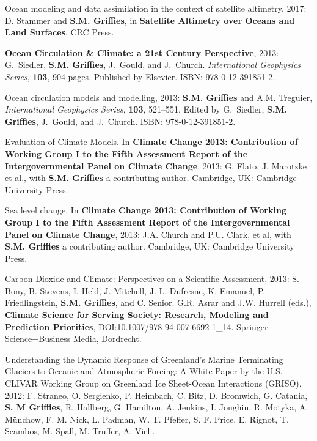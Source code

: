 \begin{etaremune}

\item Ocean modeling and data assimilation in the context of satellite altimetry, 2017: D. Stammer and {\bf S.M. Grif\/f\/ies}, in  {\bf Satellite Altimetry over Oceans and Land Surfaces}, CRC Press.
  
\item {\bf Ocean Circulation \& Climate: a 21st Century Perspective},
  2013: G.\ Siedler, {\bf S.M. Griffies}, J.\ Gould, and J.\ Church.
  {\it International Geophysics Series}, {\bf 103}, 904
  pages. Published by Elsevier.  ISBN: 978-0-12-391851-2.

\item Ocean circulation models and modelling, 2013: {\bf
    S.M. Griffies} and A.M. Treguier, {\it International Geophysics
    Series}, {\bf 103}, 521--551.  Edited by G.\ Siedler, {\bf
    S.M. Griffies}, J.\ Gould, and J.\ Church.  ISBN:
  978-0-12-391851-2.

\item Evaluation of Climate Models.  In {\bf Climate Change 2013:
    Contribution of Working Group I to the Fifth Assessment Report of
    the Intergovernmental Panel on Climate Change}, 2013: G. Flato,
  J. Marotzke et al., with {\bf S.M. Grif\/f\/ies} a contributing
  author.   Cambridge, UK: Cambridge University Press.

\item Sea level change.  In {\bf Climate Change 2013: Contribution of
    Working Group I to the Fifth Assessment Report of the
    Intergovernmental Panel on Climate Change}, 2013: J.A. Church and
  P.U. Clark, et al, with {\bf S.M. Grif\/f\/ies} a contributing
  author.  Cambridge, UK: Cambridge University Press.

\item Carbon Dioxide and Climate: Perspectives on a Scientific
  Assessment, 2013: S. Bony, B. Stevens, I. Held, J. Mitchell,
  J.-L. Dufresne, K. Emanuel, P. Friedlingstein, {\bf
    S.M. Grif\/f\/ies}, and C. Senior. G.R. Asrar and J.W. Hurrell
  (eds.), {\bf Climate Science for Serving Society: Research, Modeling
    and Prediction Priorities}, DOI:10.1007/978-94-007-6692-1\_14.
  Springer Science+Business Media, Dordrecht.

\item Understanding the Dynamic Response of Greenland’s Marine
  Terminating Glaciers to Oceanic and Atmospheric Forcing: A White
  Paper by the U.S. CLIVAR Working Group on Greenland Ice Sheet-Ocean
  Interactions (GRISO), 2012: F. Straneo, O. Sergienko, P. Heimbach,
  C. Bitz, D. Bromwich, G. Catania, {\bf S. M Grif\/f\/ies}, R.
  Hallberg, G. Hamilton, A. Jenkins, I. Joughin, R. Motyka,
  A. Münchow, F. M. Nick, L. Padman, W. T. Pfeffer, S. F. Price,
  E. Rignot, T. Scambos, M. Spall, M. Truffer, A. Vieli.


\end{etaremune}
